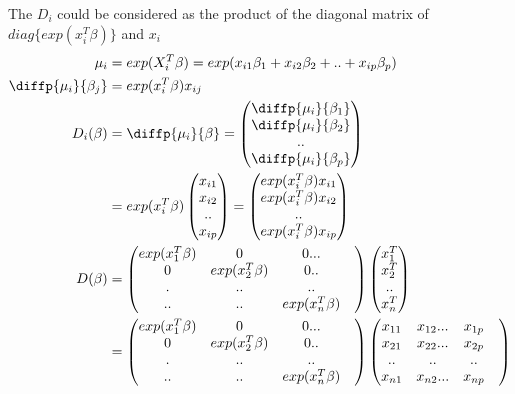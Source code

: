 \documentclass[11pt]{article} %
\begin{document}
The $D_i$ could be considered as the product of the diagonal matrix of $diag\{exp( x_i^T \beta) \}$ and $x_i$
\begin{align*}
	\mu_i &= exp(X_i^T \beta) = exp(x_{i1} \beta_1 + x_{i2} \beta_2 + .. + x_{ip} \beta_p)\\
	\diffp{\mu_i}{{\beta_j}} &= exp( x_i^T \beta) x_{ij} \\
	D_i(\beta) &= \diffp{\mu_i}{{\beta}} = \begin{pmatrix}
		\diffp{\mu_i}{{\beta_1}}  \\
		\diffp{\mu_i}{{\beta_2}} \\
		..  \\
		\diffp{\mu_i}{{\beta_p}} 
	\end{pmatrix} \\
 &= exp(x_i^T \beta) \begin{pmatrix}
x_{i1}  \\
x_{i2}\\
..  \\
x_{ip}\\
\end{pmatrix} = \begin{pmatrix}
exp(x_i^T \beta) x_{i1}  \\
exp(x_i^T \beta) x_{i2}\\
..  \\
exp(x_i^T \beta) x_{ip}\\
\end{pmatrix}\\
D(\beta) &= \begin{pmatrix}
	exp(x_1^T \beta) & 0  & 0...& \\
	0 & exp(x_2^T \beta) & 0 ..& \\
	.&..&..&  \\
	..& ..&  exp(x_n^T \beta)
\end{pmatrix} \begin{pmatrix}
	x_{1}^T  \\
	x_{2}^T \\
	..  \\
	x_{n}^T\\
\end{pmatrix}\\
 &= \begin{pmatrix}
exp(x_1^T \beta) & 0  & 0...& \\
0 & exp(x_2^T \beta) & 0 ..& \\
.&..&..&  \\
..& ..&  exp(x_n^T \beta)
\end{pmatrix} \begin{pmatrix}
x_{11} & x_{12} ... & x_{1p}  \\
x_{21} & x_{22} ... & x_{2p}  \\
.. &.. & ..&  \\
x_{n1} & x_{n2} ... & x_{np} \\
\end{pmatrix} 
\end{align*} 
\end{document}
